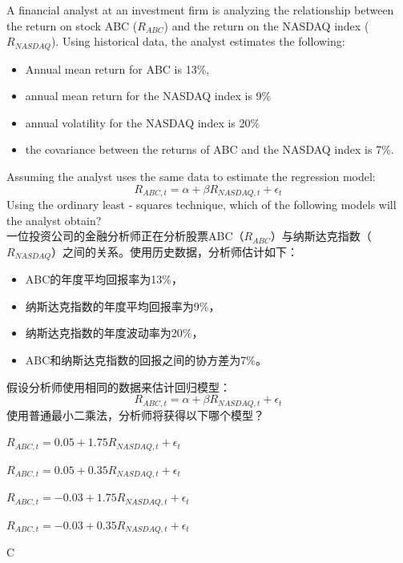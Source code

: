 \documentclass{article}
\newcounter{question} %
\begin{document}
\begin{question}
    A financial analyst at an investment firm is analyzing the relationship between the return on stock ABC (\(R_{ABC}\)) and the return on the NASDAQ index (\(R_{NASDAQ}\)). Using historical data, the analyst estimates the following: 
    \begin{itemize}
    \item Annual mean return for ABC is 13\%,
    \item annual mean return for the NASDAQ index is 9\%
    \item annual volatility for the NASDAQ index is 20\%
    \item the covariance between the returns of ABC and the NASDAQ index is 7\%. 
    \end{itemize}
    Assuming the analyst uses the same data to estimate the regression model:
    \[R_{ABC,t}=\alpha + \beta R_{NASDAQ,t}+\epsilon_t\] 
    Using the ordinary least - squares technique, which of the following models will the analyst obtain?\\
    一位投资公司的金融分析师正在分析股票ABC（\(R_{ABC}\)）与纳斯达克指数（\(R_{NASDAQ}\)）之间的关系。使用历史数据，分析师估计如下：
    \begin{itemize}
    \item ABC的年度平均回报率为13\%，
    \item 纳斯达克指数的年度平均回报率为9\%，
    \item 纳斯达克指数的年度波动率为20\%，
    \item ABC和纳斯达克指数的回报之间的协方差为7\%。
    \end{itemize}
    假设分析师使用相同的数据来估计回归模型：
    \[R_{ABC,t}=\alpha + \beta R_{NASDAQ,t}+\epsilon_t\] 
    使用普通最小二乘法，分析师将获得以下哪个模型？
    \end{question}
    
    \begin{choices}
        \item \(R_{ABC,t}= 0.05+1.75R_{NASDAQ,t}+\epsilon_t\)
        \item \(R_{ABC,t}= 0.05+0.35R_{NASDAQ,t}+\epsilon_t\)
        \item \(R_{ABC,t}= - 0.03+1.75R_{NASDAQ,t}+\epsilon_t\)
        \item \(R_{ABC,t}= - 0.03+0.35R_{NASDAQ,t}+\epsilon_t\)
    \end{choices}
    
    \begin{correctanswer}
        C
    \end{correctanswer}
    
\end{document}
